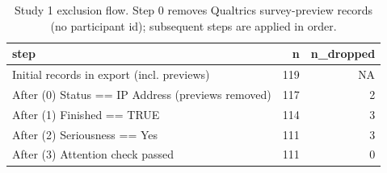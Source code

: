 \begin{table}[!h]
\centering
\caption{\label{tab:supp_exclusions}Study 1 exclusion flow. Step 0 removes Qualtrics survey-preview records (no participant id); subsequent steps are applied in order.}
\centering
\fontsize{9}{11}\selectfont
\begin{tabular}[t]{lrr}
\toprule
step & n & n\_dropped\\
\midrule
Initial records in export (incl. previews) & 119 & NA\\
After (0) Status == IP Address (previews removed) & 117 & 2\\
After (1) Finished == TRUE & 114 & 3\\
After (2) Seriousness == Yes & 111 & 3\\
After (3) Attention check passed & 111 & 0\\
\bottomrule
\end{tabular}
\end{table}